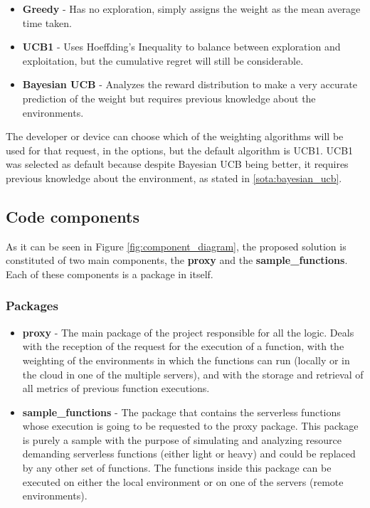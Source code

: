 \documentclass[conference]{IEEEtran}
\begin{document}
\begin{itemize}
    \item \textbf{Greedy} - Has no exploration, simply assigns the weight as the
        mean average time taken.
    \item \textbf{UCB1} - Uses Hoeffding's Inequality to balance between
        exploration and exploitation, but the cumulative regret will still be considerable.
    \item \textbf{Bayesian UCB} - Analyzes the reward distribution to make a very
        accurate prediction of the weight but requires previous knowledge about the environments.
\end{itemize}

The developer or device can choose which of the weighting algorithms will be used
for that request, in the options, but the default algorithm is UCB1. UCB1 was
selected as default because despite Bayesian UCB being better, it requires
previous knowledge about the environment, as stated in \ref{sota:bayesian_ucb}.

\subsection{Code components}

As it can be seen in Figure \ref{fig:component_diagram}, the proposed solution is
constituted of two main components, the \textbf{proxy} and the
\textbf{sample\_functions}. Each of these components is a package in itself.

\subsubsection{Packages}

\begin{itemize}
    \item \textbf{proxy} - The main package of the project responsible for
        all the logic. Deals with the reception of the request for the execution
        of a function, with the weighting of the environments in which the
        functions can run (locally or in the cloud in one of the multiple
        servers), and with the storage and retrieval of all metrics of previous
        function executions. 
    \item \textbf{sample\_functions} - The package that contains the serverless functions
        whose execution is going to be requested to the proxy package. This package is purely a sample with the purpose of simulating and analyzing resource demanding serverless functions (either light or heavy) and could be replaced by any other set of functions. The functions inside this package can be executed on either the local environment or on one of the servers (remote environments).
\end{itemize}
\end{document}
